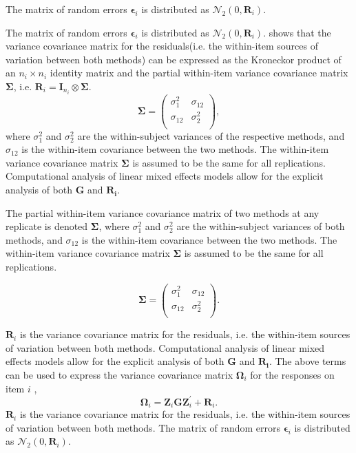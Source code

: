 \documentclass[12pt, a4paper]{report}
\theoremstyle{plain}
\theoremstyle{definition}
\theoremstyle{remark}
\begin{document}

The matrix of random errors $\boldsymbol{\epsilon}_i$ is distributed as $\mathcal{N}_2(0,\boldsymbol{R}_i)$.



The matrix of random errors $\boldsymbol{\epsilon}_i$ is distributed as $\mathcal{N}_2(0,\boldsymbol{R}_i)$.
\citet{hamlett} shows that the variance covariance matrix for the residuals(i.e. the within-item sources of variation between both methods) can be expressed as the Kroneckor product of an $n_i \times n_i$ identity matrix and the partial within-item variance covariance matrix $\boldsymbol{\Sigma}$, i.e. $\boldsymbol{R}_{i} = \boldsymbol{I}_{n_{i}} \otimes \boldsymbol{\Sigma}$.
\[
\boldsymbol{\Sigma} = \left( \begin{array}{cc}
\sigma^2_{1} & \sigma_{12} \\
\sigma_{12} & \sigma^2_{2} \\
\end{array}\right),
\]
where $\sigma^2_{1}$ and $\sigma^2_{2}$ are the within-subject variances of the respective methods, and $\sigma_{12}$ is the within-item covariance between the two methods. The within-item variance covariance matrix $\boldsymbol{\Sigma}$ is assumed to be the same for all replications. Computational analysis of linear mixed effects models allow for the explicit analysis of both $\boldsymbol{G}$ and $\boldsymbol{R_i}$. 

\bigskip

The partial within-item variance covariance matrix of two methods at any replicate is denoted $\boldsymbol{\Sigma}$, where $\sigma^2_{1}$ and $\sigma^2_{2}$ are the within-subject variances of both methods, and $\sigma_{12}$ is the within-item covariance between the two methods. The within-item variance covariance matrix $\boldsymbol{\Sigma}$ is assumed to be the same for all replications.

\[
\boldsymbol{\Sigma} = \left( \begin{array}{cc}
\sigma^2_{1} & \sigma_{12} \\
\sigma_{12} & \sigma^2_{2} \\
\end{array}\right).
\]	



$\boldsymbol{R}_{i}$ is the variance covariance matrix for the residuals, i.e. the within-item sources of variation between both methods. Computational analysis of linear mixed effects models allow for the explicit analysis of both $\boldsymbol{G}$ and $\boldsymbol{R_i}$.
The above terms can be used to express the  variance covariance matrix $\boldsymbol{\Omega}_i$ for the responses on item $i$ ,
\[
\boldsymbol{\Omega}_i = \boldsymbol{Z}_i \boldsymbol{G} \boldsymbol{Z}_i^{\prime} + \boldsymbol{R}_i.
\]
$\boldsymbol{R}_{i}$ is the variance covariance matrix for the residuals, i.e. the within-item sources of variation between both methods.	
The matrix of random errors $\boldsymbol{\epsilon}_i$ is distributed as $\mathcal{N}_2(0,\boldsymbol{R}_i)$.
\end{document}
